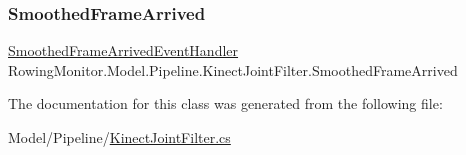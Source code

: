 \subsubsection{\texorpdfstring{Smoothed\+Frame\+Arrived}{SmoothedFrameArrived}}
{\footnotesize\ttfamily \hyperlink{class_rowing_monitor_1_1_model_1_1_pipeline_1_1_kinect_joint_filter_ac3f380b74d953666c314d93452c3e1f5}{Smoothed\+Frame\+Arrived\+Event\+Handler} Rowing\+Monitor.\+Model.\+Pipeline.\+Kinect\+Joint\+Filter.\+Smoothed\+Frame\+Arrived}



The documentation for this class was generated from the following file\+:\begin{DoxyCompactItemize}
\item 
Model/\+Pipeline/\hyperlink{_kinect_joint_filter_8cs}{Kinect\+Joint\+Filter.\+cs}\end{DoxyCompactItemize}
